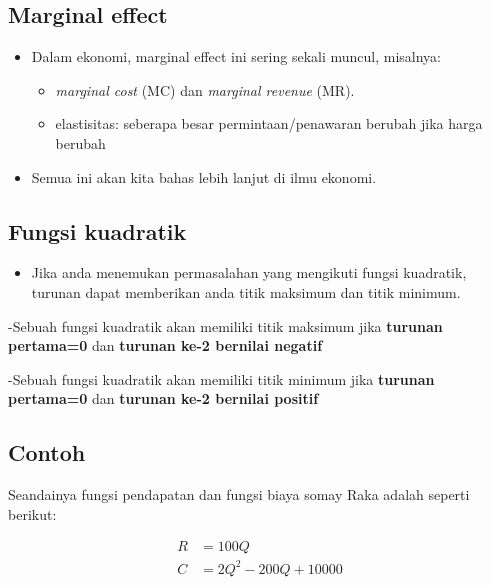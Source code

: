 \documentclass[
  letterpaper,
  DIV=11,
  numbers=noendperiod]{scrartcl}
\providecommand{\tightlist}{%
  \setlength{\itemsep}{0pt}\setlength{\parskip}{0pt}}\usepackage{longtable,booktabs,array}
\begin{document}
\hypertarget{marginal-effect-1}{%
\subsection{Marginal effect}\label{marginal-effect-1}}

\begin{itemize}
\item
  Dalam ekonomi, marginal effect ini sering sekali muncul, misalnya:

  \begin{itemize}
  \item
    \emph{marginal cost} (MC) dan \emph{marginal revenue} (MR).
  \item
    elastisitas: seberapa besar permintaan/penawaran berubah jika harga
    berubah
  \end{itemize}
\item
  Semua ini akan kita bahas lebih lanjut di ilmu ekonomi.
\end{itemize}

\hypertarget{fungsi-kuadratik}{%
\subsection{Fungsi kuadratik}\label{fungsi-kuadratik}}

\begin{itemize}
\tightlist
\item
  Jika anda menemukan permasalahan yang mengikuti fungsi kuadratik,
  turunan dapat memberikan anda titik maksimum dan titik minimum.
\end{itemize}

-Sebuah fungsi kuadratik akan memiliki titik maksimum jika
\textbf{turunan pertama=0} dan \textbf{turunan ke-2 bernilai negatif}

-Sebuah fungsi kuadratik akan memiliki titik minimum jika
\textbf{turunan pertama=0} dan \textbf{turunan ke-2 bernilai positif}

\hypertarget{contoh-7}{%
\subsection{Contoh}\label{contoh-7}}

Seandainya fungsi pendapatan dan fungsi biaya somay Raka adalah seperti
berikut:

\[
\begin{align}
R&=100Q \\
C&=2Q^2-200Q+10000
\end{align}
\]
\end{document}
